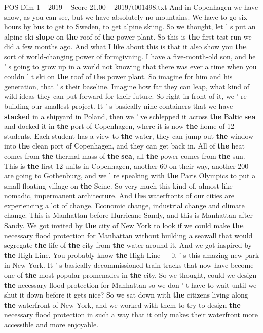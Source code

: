\begin{textsample}{POS Dim 1 – 2019 – Score 21.00 – 2019/t001498.txt}
And in Copenhagen we have snow, as you can see, but we have absolutely no mountains.
We have to go six hours by bus to get to Sweden, to get alpine skiing.
So we thought, let ' s put an alpine ski \textbf{slope} on \textbf{the} roof of \textbf{the} power plant.
So this is \textbf{the} first test run we did a few months ago.
And what I like about this is that it also show you \textbf{the} sort of world-changing power of formgivning.
I have a five-month-old son, and he ' s going to grow up in a world not knowing that there was ever a time when you couldn ' t ski on \textbf{the} roof of \textbf{the} power plant.
So imagine for him and his generation, that ' s their baseline.
Imagine how far they can leap, what kind of wild ideas they can put forward for their future.
So right in front of it, we ' re building our smallest project.
It ' s basically nine containers that we have \textbf{stacked} in a shipyard in Poland, then we ' ve schlepped it across \textbf{the} Baltic \textbf{sea} and docked it in \textbf{the} port of Copenhagen, where it is now \textbf{the} home of 12 students.
Each student has a view to \textbf{the} water, they can jump out \textbf{the} window into \textbf{the} clean port of Copenhagen, and they can get back in.
All of \textbf{the} heat comes from \textbf{the} thermal mass of \textbf{the} \textbf{sea}, all \textbf{the} power comes from \textbf{the} sun.
This is \textbf{the} first 12 units in Copenhagen, another 60 on their way, another 200 are going to Gothenburg, and we ' re speaking with \textbf{the} Paris Olympics to put a small floating village on \textbf{the} Seine.
So very much this kind of, almost like nomadic, impermanent architecture.
And \textbf{the} waterfronts of our cities are experiencing a lot of change.
Economic change, industrial change and climate change.
This is Manhattan before Hurricane Sandy, and this is Manhattan after Sandy.
We got invited by \textbf{the} city of New York to look if we could make \textbf{the} necessary flood protection for Manhattan without building a seawall that would segregate \textbf{the} life of \textbf{the} city from \textbf{the} water around it.
And we got inspired by \textbf{the} High Line.
You probably know \textbf{the} High Line — it ' s this amazing new park in New York.
It ' s basically decommissioned train tracks that now have become one of \textbf{the} most popular promenades in \textbf{the} city.
So we thought, could we design \textbf{the} necessary flood protection for Manhattan so we don ' t have to wait until we shut it down before it gets nice?
So we sat down with \textbf{the} citizens living along \textbf{the} waterfront of New York, and we worked with them to try to design \textbf{the} necessary flood protection in such a way that it only makes their waterfront more accessible and more enjoyable.

\end{textsample}
